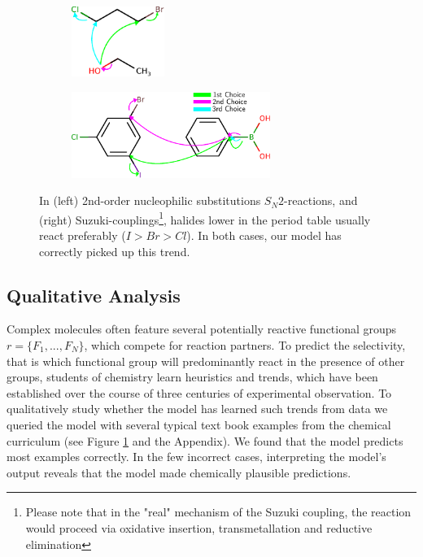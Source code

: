 
\begin{figure}[t]

    \centering
    \begin{subfigure}[b]{0.3\textwidth}
        \centering
        \includegraphics[height=0.9in]{imgs/textbook/reaction3}\\\vspace{0.1in}
    \end{subfigure}%
    \hspace{1cm}
     \begin{subfigure}[b]{0.5\textwidth}
        \centering
        \includegraphics[height=1.1in]{imgs/textbook/reaction7}
    \end{subfigure}
	\caption{In (left) 2nd-order nucleophilic substitutions $S_N 2$-reactions, and (right) Suzuki-couplings\footnote{Please note that in the "real" mechanism of the Suzuki coupling, the reaction would proceed via oxidative insertion, transmetallation and reductive elimination }, halides lower in the period table usually react preferably ($I>Br>Cl$). In both cases, our model has correctly picked up this trend. }
	\label{fig:qualitative}
\vspace{-0.5em}
\end{figure}



\subsection{Qualitative Analysis}

Complex molecules often feature several potentially reactive functional groups $r=\{F_1,...,F_N\}$, which compete for reaction partners. 
To predict the selectivity, that is which functional group will predominantly react in the presence of other groups, 
students of chemistry learn heuristics and trends, 
which have been established over the course of three centuries of experimental observation.
To qualitatively study whether the model has learned such trends from data we queried the model with several typical text book examples from the chemical curriculum (see Figure \ref{fig:qualitative} and the Appendix). 
We found that the model predicts most examples correctly. In the few incorrect cases, interpreting the model's output reveals that the model made chemically plausible predictions.

